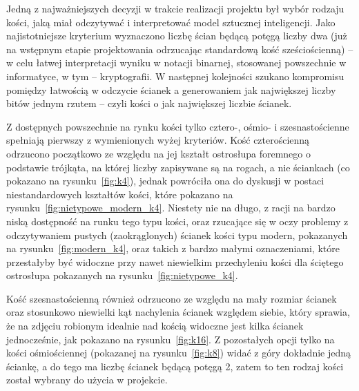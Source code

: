 Jedną z najważniejszych decyzji w trakcie realizacji projektu był wybór rodzaju kości, jaką miał odczytywać
i interpretować model sztucznej inteligencji.
Jako najistotniejsze kryterium wyznaczono liczbę ścian będącą potęgą liczby dwa
(już na wstępnym etapie projektowania odrzucając standardową kość sześciościenną) --
w celu łatwej interpretacji wyniku w notacji binarnej, stosowanej powszechnie w informatyce, w tym -- kryptografii.
W następnej kolejności szukano kompromisu pomiędzy łatwością w odczycie ścianek a generowaniem jak największej liczby
bitów jednym rzutem -- czyli kości o jak największej liczbie ścianek.

Z dostępnych powszechnie na rynku kości tylko cztero-, ośmio- i szesnastościenne spełniają pierwszy z wymienionych wyżej kryteriów.
Kość czterościenną odrzucono początkowo ze względu na jej kształt ostrosłupa foremnego o podstawie trójkąta,
na której liczby zapisywane są na rogach, a nie ściankach (co pokazano na rysunku~\ref{fig:k4}),
jednak powróciła ona do dyskusji w postaci niestandardowych kształtów kości, które pokazano na rysunku~\ref{fig:nietypowe_modern_k4}.
Niestety nie na długo, z racji na bardzo niską dostępność na runku tego typu kości, oraz rzucające się w oczy problemy
z odczytywaniem pustych (zaokrąglonych) ścianek kości typu modern, pokazanych na rysunku~\ref{fig:modern_k4},
oraz takich z bardzo małymi oznaczeniami, które przestałyby być widoczne przy nawet niewielkim przechyleniu kości
dla ściętego ostrosłupa pokazanych na rysunku~\ref{fig:nietypowe_k4}.

Kość szesnastościenną również odrzucono ze względu na mały rozmiar ścianek oraz stosunkowo niewielki kąt nachylenia ścianek względem siebie,
który sprawia, że na zdjęciu robionym idealnie nad kością widoczne jest kilka ścianek jednocześnie, jak pokazano na rysunku~\ref{fig:k16}.
Z pozostałych opcji tylko na kości ośmiościennej (pokazanej na rysunku~\ref{fig:k8}) widać z góry dokładnie jedną ściankę,
a do tego ma liczbę ścianek będącą potęgą 2, zatem to ten rodzaj kości został wybrany do użycia w projekcie.

